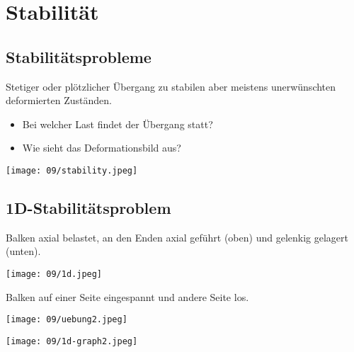 \section{Stabilität}
    \subsection{Stabilitätsprobleme}
        Stetiger oder plötzlicher Übergang zu stabilen aber meistens unerwünschten deformierten Zuständen.\vspace{-1mm}
        \begin{itemize}
            \item Bei welcher Last findet der Übergang statt?
            \item Wie sieht das Deformationsbild aus?
        \end{itemize}
        \begin{center}
            \texttt{[image: 09/stability.jpeg]}
        \end{center}
    \subsection{1D-Stabilitätsproblem}
        Balken axial belastet, an den Enden axial geführt (oben) und gelenkig gelagert (unten).
        \begin{center}
            \texttt{[image: 09/1d.jpeg]}
        \end{center}
\columnbreak
        Balken auf einer Seite eingespannt und andere Seite los.
        \begin{center}
            \texttt{[image: 09/uebung2.jpeg]}
        \end{center}
        \begin{center}
             \texttt{[image: 09/1d-graph2.jpeg]}
        \end{center}
        
